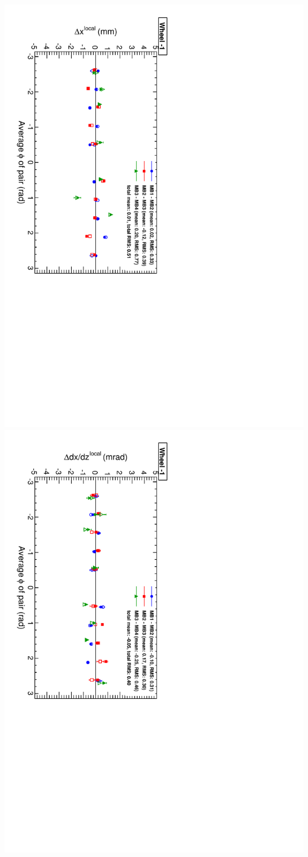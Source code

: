 \documentclass[compress]{beamer}
\begin{document}
\begin{frame}
\vspace{-0.1 cm}
\includegraphics[height=0.5\linewidth, angle=90]{NOV4_segdiff_x_whm1.pdf}
\includegraphics[height=0.5\linewidth, angle=90]{NOV4_segdiff_dxdz_whm1.pdf}
\end{frame}
\end{document}
